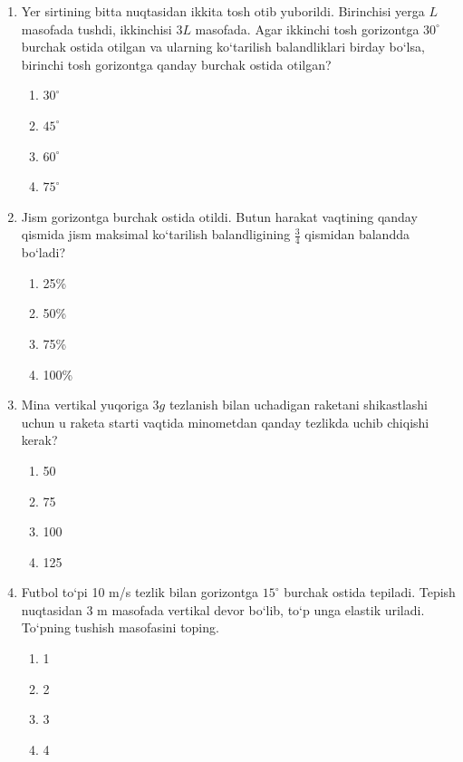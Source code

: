 \begin{enumerate}
\item Yer sirtining bitta nuqtasidan ikkita tosh otib yuborildi. Birinchisi yerga $L$ masofada tushdi, ikkinchisi $3L$ masofada. Agar ikkinchi tosh gorizontga $30^\circ$ burchak ostida otilgan va ularning ko‘tarilish balandliklari birday bo‘lsa, birinchi tosh gorizontga qanday burchak ostida otilgan?

\begin{enumerate}[label=\Alph*)]
\item $30^\circ$
\item $45^\circ$
\item $60^\circ$
\item $75^\circ$
\end{enumerate}

\item Jism gorizontga burchak ostida otildi. Butun harakat vaqtining qanday qismida jism maksimal ko‘tarilish balandligining $\frac{3}{4}$ qismidan balandda bo‘ladi?

\begin{enumerate}[label=\Alph*)]
\item 25\%
\item 50\%
\item 75\%
\item 100\%
\end{enumerate}

\item Mina vertikal yuqoriga $3g$ tezlanish bilan uchadigan raketani shikastlashi uchun u raketa starti vaqtida minometdan qanday tezlikda uchib chiqishi kerak?

\begin{enumerate}[label=\Alph*)]
\item 50
\item 75
\item 100
\item 125
\end{enumerate}

\item Futbol to‘pi 10 m/s tezlik bilan gorizontga $15^\circ$ burchak ostida tepiladi. Tepish nuqtasidan 3 m masofada vertikal devor bo‘lib, to‘p unga elastik uriladi. To‘pning tushish masofasini toping.

\begin{enumerate}[label=\Alph*)]
\item 1
\item 2
\item 3
\item 4
\end{enumerate}


\end{enumerate}
